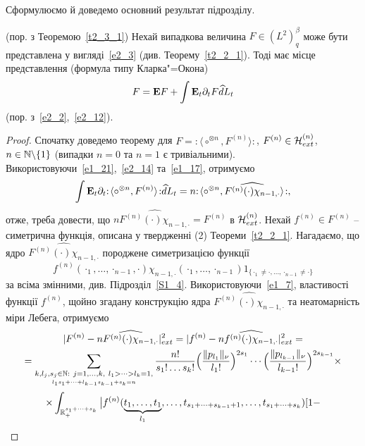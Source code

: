 Сформулюємо й доведемо основний результат підрозділу.
\begin{subtheorem}{\rm (пор. з Теоремою~\ref{t2_3_1})}
Нехай випадкова величина $F\in (L^2)^\beta_q$ може бути представлена у вигляді~\eqref{e2_3}
(див. Теорему~\ref{t2_2_1}). Тоді має місце представлення (формула типу Кларка"=Окона)
\begin{equation}\label{e2_16}
F=\mathbf{E}{F}+\int\mathbf{E}_t\partial_t F\widehat dL_t
\end{equation}
(пор. з~\eqref{e2_2},~\eqref{e2_12}).
\end{subtheorem}
\begin{proof}
Спочатку доведемо теорему для $F={:\!\langle}\circ^{\otimes n},F^{(n)}{\rangle\!:}$,
$F^{(n)}\in\mathcal{H}_{ext}^{(n)}$, $n\in\mathbb{N}\backslash\{1\}$ (випадки $n=0$ та $n=1$ є
тривіальними). Використовуючи~\eqref{e1_21},~\eqref{e2_14} та~\eqref{e1_17}, отримуємо
\begin{equation*}
\int\mathbf{E}_t\partial_t{:\!\langle}\circ^{\otimes n},F^{(n)}{\rangle\!:}\widehat dL_t
=n{:\!\langle}\circ^{\otimes n},\widehat{F^{(n)}(\cdot)\chi_{n-1,\cdot}}{\rangle\!:},
\end{equation*}
отже, треба довести, що $n\widehat{F^{(n)}(\cdot)\chi_{n-1,\cdot}}=F^{(n)}$ в
$\mathcal{H}_{ext}^{(n)}$. Нехай $f^{(n)}\in F^{(n)}$ -- симетрична функція, описана у
твердженні (2) Теореми~\ref{t2_2_1}. Нагадаємо, що ядро
$\widehat{F^{(n)}(\cdot)\chi_{n-1,\cdot}}$ породжене симетризацією функції
\begin{equation*}
f^{(n)}(\cdot_1,\dots,\cdot_{n-1},\cdot)\chi_{n-1,\cdot}(\cdot_1,\dots,\cdot_{n-1})
1_{\{\cdot_1\not=\cdot,\dots,\cdot_{n-1}\not=\cdot\}}
\end{equation*}
за всіма змінними, див. Підрозділ~\ref{S1_4}. Використовуючи~\eqref{e1_7}, властивості функції
$f^{(n)}$, щойно згадану конструкцію ядра $\widehat{F^{(n)}(\cdot)\chi_{n-1,\cdot}}$ та
неатомарність міри Лебега, отримуємо
\begin{gather*}
|F^{(n)}-n\widehat{F^{(n)}(\cdot)\chi_{n-1,\cdot}}|_{ext}^2
=|f^{(n)}-n\widehat{f^{(n)}(\cdot)\chi_{n-1,\cdot}}|_{ext}^2=\\
=\sum_{\underset{l_1s_1+\cdots+l_{k-1}s_{k-1}+s_k=n}
{k,l_j,s_j\in\bN:
\ j=1,\dots,k,\ l_1>\cdots>l_k=1,}}
\frac{n!}{s_1!\dots s_k!}
\Big(\frac{\|p_{l_1}\|_\nu}{l_1!}\Big)^{2s_1}
\cdots\Big(\frac{\|p_{l_{k-1}}\|_\nu}{l_{k-1}!}\Big)^{2s_{k-1}}\times\\
\times\int_{\bR_+^{s_1+\cdots+s_k}}\big|f^{(n)}(
\underset{l_1}{\underbrace{t_1,\dots,t_1}},\dots,
t_{s_1+\cdots+s_{k-1}+1},\dots,t_{s_1+\cdots+s_k})[1-\\

\end{gather*}
\end{proof}
